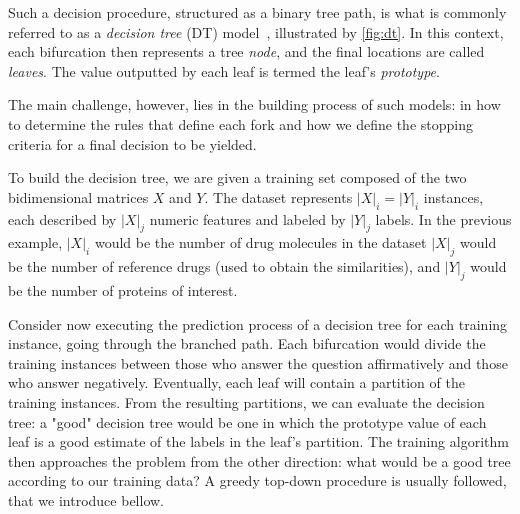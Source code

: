 Such a decision procedure, structured as a binary tree path, is what is commonly referred to as a \emph{decision tree} (DT) model~\cite{breiman1984classification}, illustrated by \autoref{fig:dt}. 
In this context, each bifurcation then represents a tree \emph{node}, and the final locations are called \emph{leaves}. The value outputted by each leaf is termed the leaf's \emph{prototype}.
%


The main challenge, however, lies in the building process of such models: in how to determine the rules that define each fork and how we define the stopping criteria for a final decision to be yielded.

To build the decision tree, we are given a training set composed of the two bidimensional matrices $X$ and $Y$. The dataset represents $|X|_i = |Y|_i$ instances, each described by $|X|_j$ numeric features and labeled by $|Y|_j$ labels.
In the previous example, $|X|_i$ would be the number of drug molecules in the dataset
$|X|_j$ would be the number of reference drugs (used to obtain the similarities), and $|Y|_j$ would be the number of proteins of interest.



Consider now executing the prediction process of a decision tree for each training instance, going through the branched path. Each bifurcation would divide the training instances between those who answer the question affirmatively and those who answer negatively. Eventually, each leaf will contain a partition of the training instances.
From the resulting partitions, we can evaluate the decision tree:
a "good" decision tree would be one in which the prototype value of each leaf is a good estimate of the labels in the leaf's partition.
%
The training algorithm then approaches the problem from the other direction: what would be a good tree according to our training data?
A greedy top-down procedure is usually followed, that we introduce bellow.


